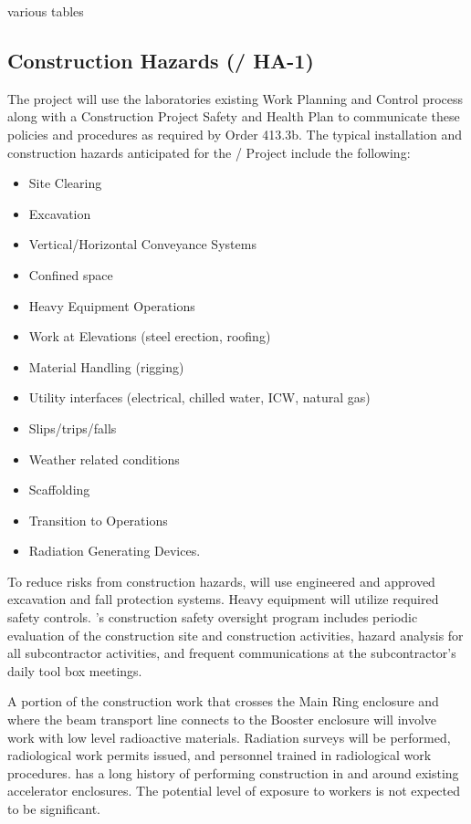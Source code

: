 various tables

\subsection{Construction Hazards (/ HA-1)}

The project will use the laboratories existing Work Planning and
Control process along with a Construction Project Safety and Health
Plan to communicate these policies and procedures as required by 
Order 413.3b. The typical installation and construction hazards
anticipated for the / Project include the following:
\begin{itemize}
 \item Site Clearing
 \item Excavation
 \item Vertical/Horizontal Conveyance Systems
 \item Confined space
 \item Heavy Equipment Operations
 \item Work at Elevations (steel erection, roofing)
 \item Material Handling (rigging)
 \item Utility interfaces (electrical, chilled water, ICW, natural gas)
 \item Slips/trips/falls
 \item Weather related conditions
 \item Scaffolding
 \item Transition to Operations
 \item Radiation Generating Devices.
\end{itemize}

To reduce risks from construction hazards, \fnal will use
engineered and approved excavation and fall protection systems.  Heavy
equipment will utilize required safety controls. \fnal's
construction safety oversight program includes periodic evaluation of
the construction site and construction activities, hazard analysis for
all subcontractor activities, and frequent  communications at the
subcontractor's daily tool box meetings.

 A portion of the construction work that crosses the Main Ring
enclosure and where the beam transport line connects to the Booster
enclosure will involve work with low level radioactive
materials. Radiation surveys will be performed, radiological work
permits issued, and personnel trained in radiological work
procedures. \fnal has a long history of performing construction in
and around existing accelerator enclosures. The potential level of
exposure to workers is not expected to be significant.

